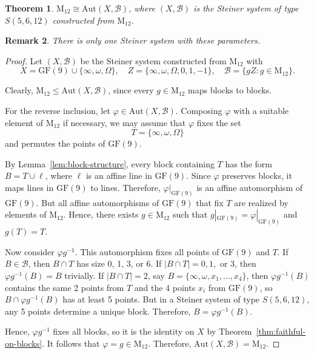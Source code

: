 \documentclass[12pt,a4paper,openany]{book}
\newtheorem{theorem}{Theorem}[section]
\newcommand{\GF}{\mathrm{GF}}
\newcommand{\Aut}{\mathrm{Aut}}
\newtheorem{remark}[theorem]{Remark}
\begin{document}
\begin{theorem}\label{thm:M12-aut}
$\mathrm{M}_{12} \cong \Aut(X, \mathscr{B})$, where $(X, \mathscr{B})$ is the Steiner system of type $S(5,6,12)$ constructed from $\mathrm{M}_{12}$.
\end{theorem}

\begin{remark}
There is only one Steiner system with these parameters.
\end{remark}

\begin{proof}
Let $(X, \mathscr{B})$ be the Steiner system constructed from $\mathrm{M}_{12}$ with 
\[
X = \GF(9) \cup \{\infty, \omega, \Omega\}, \quad Z = \{\infty, \omega, \Omega, 0, 1, -1\}, \quad \mathscr{B} = \{gZ : g \in \mathrm{M}_{12}\}.
\]

Clearly, $\mathrm{M}_{12} \leq \Aut(X, \mathscr{B})$, since every $g \in \mathrm{M}_{12}$ maps blocks to blocks. 

For the reverse inclusion, let $\varphi \in \Aut(X, \mathscr{B})$. Composing $\varphi$ with a suitable element of $\mathrm{M}_{12}$ if necessary, we may assume that $\varphi$ fixes the set 
\[
T = \{\infty, \omega, \Omega\}
\] 
and permutes the points of $\GF(9)$. 

By Lemma~\ref{lem:block-structure}, every block containing $T$ has the form $B = T \cup \ell$, where $\ell$ is an affine line in $\GF(9)$. Since $\varphi$ preserves blocks, it maps lines in $\GF(9)$ to lines. Therefore, $\varphi|_{\GF(9)}$ is an affine automorphism of $\GF(9)$. But all affine automorphisms of $\GF(9)$ that fix $T$ are realized by elements of $\mathrm{M}_{12}$. Hence, there exists $g \in \mathrm{M}_{12}$ such that $g|_{\GF(9)} = \varphi|_{\GF(9)}$ and $g(T) = T$.

Now consider $\varphi g^{-1}$. This automorphism fixes all points of $\GF(9)$ and $T$. If $B \in \mathscr{B}$, then $B \cap T$ has size 0, 1, 3, or 6. If $|B \cap T| = 0, 1,$ or $3$, then $\varphi g^{-1}(B) = B$ trivially. If $|B \cap T| = 2$, say $B = \{\infty, \omega, x_1, \dots, x_4\}$, then $\varphi g^{-1}(B)$ contains the same 2 points from $T$ and the 4 points $x_i$ from $\GF(9)$, so $B \cap \varphi g^{-1}(B)$ has at least 5 points. But in a Steiner system of type $S(5,6,12)$, any 5 points determine a unique block. Therefore, $B = \varphi g^{-1}(B)$.

Hence, $\varphi g^{-1}$ fixes all blocks, so it is the identity on $X$ by Theorem~\ref{thm:faithful-on-blocks}. It follows that $\varphi = g \in \mathrm{M}_{12}$. Therefore, $\Aut(X, \mathscr{B}) = \mathrm{M}_{12}$.
\end{proof}
\end{document}

